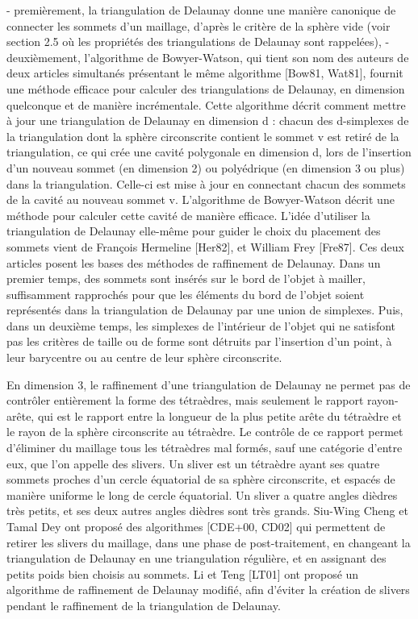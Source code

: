 { - premièrement, la triangulation de Delaunay donne une manière canonique de connecter les sommets d'un maillage, d'après le critère de la sphère vide (voir section 2.5 o\`u les propriétés des triangulations de Delaunay sont rappelées),
 - deuxièmement, l'algorithme de Bowyer-Watson, qui tient son nom des auteurs de deux articles simultanés présentant le même algorithme [Bow81, Wat81], fournit une méthode efficace pour calculer des triangulations de Delaunay, en dimension quelconque et de manière incrémentale. Cette algorithme décrit comment mettre à jour une triangulation de Delaunay en dimension d : chacun des d-simplexes de la triangulation dont la sphère circonscrite contient le sommet v est retiré de la triangulation, ce qui crée une cavité polygonale en dimension d, lors de l'insertion d'un nouveau sommet (en dimension 2) ou polyédrique (en dimension 3 ou plus) dans la triangulation. Celle-ci est mise à jour en connectant chacun des sommets de la cavité au nouveau sommet v. L'algorithme de Bowyer-Watson décrit une méthode pour calculer cette cavité de manière efficace.
L'idée d'utiliser la triangulation de Delaunay elle-même pour guider le choix du placement des sommets vient de François Hermeline [Her82], et William Frey [Fre87]. Ces deux articles posent les bases des méthodes de raffinement de Delaunay. Dans un premier temps, des sommets sont insérés sur le bord de l'objet à mailler, suffisamment rapprochés pour que les éléments du bord de l'objet soient représentés dans la triangulation de Delaunay par une union de simplexes. Puis, dans un deuxième temps, les simplexes de l'intérieur de l'objet qui ne satisfont pas les critères de taille ou de forme sont détruits par l'insertion d'un point, à leur barycentre ou au centre de leur sphère circonscrite.

En dimension 3, le raffinement d'une triangulation de Delaunay ne permet pas de contrôler entièrement la forme des tétraèdres, mais seulement le rapport rayon-arête, qui est le rapport entre la longueur de la plus petite arête du tétraèdre et le rayon de la sphère circonscrite au tétraèdre. Le contrôle de ce rapport permet d'éliminer du maillage tous les tétraèdres mal formés, sauf une catégorie d'entre eux, que l'on appelle des slivers. Un sliver est un tétraèdre  ayant ses quatre sommets proches d'un cercle équatorial de sa sphère circonscrite, et espacés de manière uniforme le long de cercle équatorial. Un sliver a quatre angles dièdres très petits, et ses deux autres angles dièdres sont très grands. Siu-Wing Cheng et Tamal Dey ont proposé des algorithmes [CDE+00, CD02] qui permettent de retirer les slivers du maillage, dans une phase de post-traitement, en changeant la triangulation de Delaunay en une triangulation régulière, et en assignant des petits poids bien choisis au sommets. Li et Teng [LT01] ont proposé un algorithme de raffinement de Delaunay modifié, afin d'éviter la création de slivers pendant le raffinement de la triangulation de Delaunay.

}

\section{}


